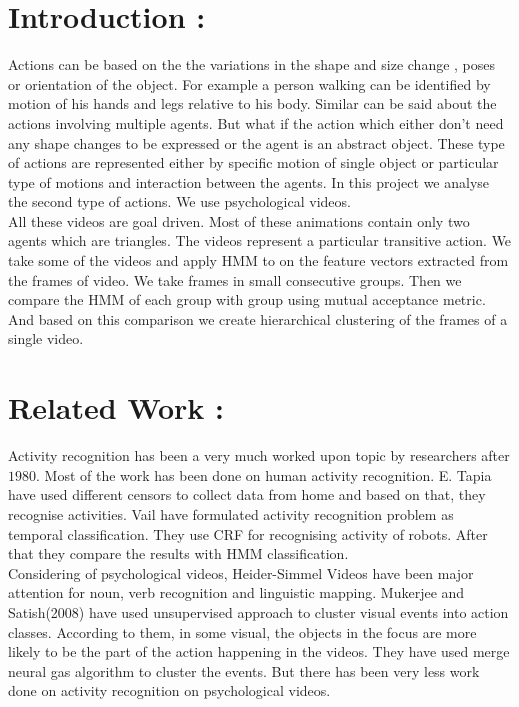 \documentclass[10pt, twocolumn]{article}
\begin{document}
\section*{Introduction : }  Actions can be based on the the variations in the shape and size change , poses\cite{pami-Ben-ArieWPR02}  or orientation of the object. For example a person walking can be identified by motion of his hands and legs relative to his body. Similar can be said about the actions involving multiple agents. But what if the action which either don't need any shape changes to be expressed or the agent is an abstract object. These type of actions are represented either by specific motion of single object or particular type of motions and interaction between the agents. In this project we analyse the second type of actions. We use psychological videos\cite{fhanimation}. \\

All these videos are goal driven. Most of these animations contain only two agents which are triangles. The videos represent a particular transitive action. We take some of the videos and apply HMM to on the feature vectors extracted from the frames of video. We take frames in small consecutive groups. Then we compare the HMM of each group with  group using mutual acceptance metric. And based on this comparison we create hierarchical clustering of the frames of a single video.   


\section*{Related Work :}
Activity recognition has been a very much worked upon topic by researchers after $1980$. Most of the work has been done on human activity recognition. E. Tapia \cite{TapiaIL04} have used different censors to collect data from home and based on that, they recognise activities. Vail \cite{VailVL07} have formulated activity recognition problem as temporal classification. They use CRF for recognising activity of robots. After that they compare the results with HMM classification.\\
\hspace*{10pt} Considering of psychological videos, Heider-Simmel Videos \cite{heider} have been major attention for noun, verb recognition and linguistic mapping. Mukerjee and Satish(2008)\cite{satish-mukerjee-2008icdl} have used unsupervised approach to cluster visual events into action classes. According to them, in some visual, the objects in the focus are more likely to be the part of the action happening in the videos. They have used merge neural gas algorithm to cluster the events. But there has been very less work done on activity recognition on psychological videos. 
\end{document}
